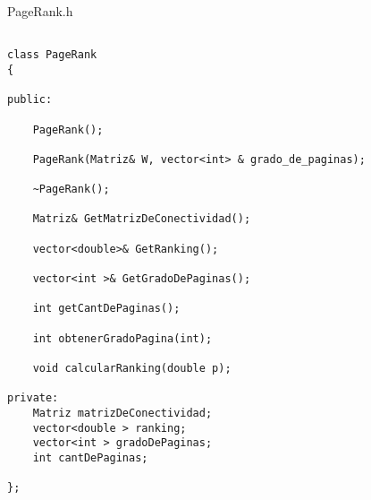 \begin{center}
{\small PageRank.h\\}
\end{center}
\begin{lstlisting} 

class PageRank
{

public:

    PageRank();

    PageRank(Matriz& W, vector<int> & grado_de_paginas);

    ~PageRank();

    Matriz& GetMatrizDeConectividad();

    vector<double>& GetRanking();

    vector<int >& GetGradoDePaginas();

    int getCantDePaginas();

    int obtenerGradoPagina(int);

    void calcularRanking(double p);	

private:
    Matriz matrizDeConectividad;
    vector<double > ranking;   
    vector<int > gradoDePaginas;    
    int cantDePaginas; 

};

\end{lstlisting}




